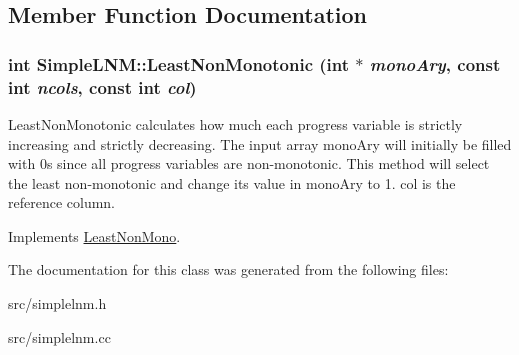\subsection{Member Function Documentation}
\hypertarget{classSimpleLNM_a9d296839ca84467c0f6241b1393bd6d5}{
\subsubsection[{LeastNonMonotonic}]{\setlength{\rightskip}{0pt plus 5cm}int SimpleLNM::LeastNonMonotonic (int $\ast$ {\em monoAry}, \/  const int {\em ncols}, \/  const int {\em col})}}
\label{d8/dfe/classSimpleLNM_a9d296839ca84467c0f6241b1393bd6d5}
LeastNonMonotonic calculates how much each progress variable is strictly increasing and strictly decreasing. The input array monoAry will initially be filled with 0s since all progress variables are non-\/monotonic. This method will select the least non-\/monotonic and change its value in monoAry to 1. col is the reference column. 

Implements \hyperlink{classLeastNonMono}{LeastNonMono}.

The documentation for this class was generated from the following files:\begin{DoxyCompactItemize}
\item 
src/simplelnm.h\item 
src/simplelnm.cc\end{DoxyCompactItemize}
